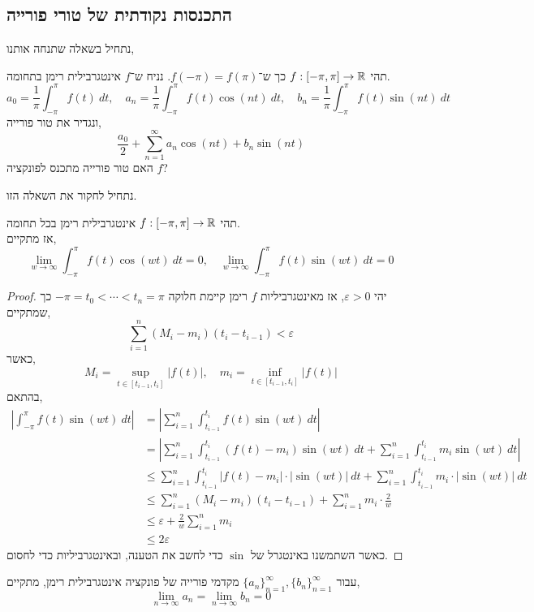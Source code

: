 \subsection{התכנסות נקודתית של טורי פורייה}
נתחיל בשאלה שתנחה אותנו,
\begin{exercise}
	תהי $f : [-\pi, \pi] \to \mathbb{R}$ כך ש־$f(-\pi) = f(\pi)$.
	נניח ש־$f$ אינטגרבילית רימן בתחומה.
	\[
		a_0 = \frac{1}{\pi} \int_{-\pi}^{\pi} f(t)\ dt,
		\quad
		a_n = \frac{1}{\pi} \int_{-\pi}^{\pi} f(t) \cos(nt)\ dt,
		\quad
		b_n = \frac{1}{\pi} \int_{-\pi}^{\pi} f(t) \sin(nt)\ dt
	\]
	ונגדיר את טור פורייה,
	\[
		\frac{a_0}{2} + \sum_{n = 1}^\infty a_n \cos(nt) + b_n \sin(nt)
	\]
	האם טור פורייה מתכנס לפונקציה $f$?
\end{exercise}
נתחיל לחקור את השאלה הזו.
\begin{lemma}
	תהי $f : [-\pi, \pi] \to \mathbb{R}$ אינטגרבילית רימן בכל תחומה. \\
	אז מתקיים,
	\[
		\lim_{w \to \infty} \int_{-\pi}^{\pi} f(t) \cos(w t)\ dt = 0,
		\quad
		\lim_{w \to \infty} \int_{-\pi}^{\pi} f(t) \sin(w t)\ dt = 0
	\]
\end{lemma}
\begin{proof}
	יהי $\varepsilon > 0$, אז מאינטגרביליות $f$ רימן קיימת חלוקה $-\pi = t_0 < \cdots < t_n = \pi$ כך שמתקיים,
	\[
		\sum_{i = 1}^n (M_i - m_i) (t_i - t_{i - 1})
		< \varepsilon
	\]
	כאשר,
	\[
		M_i = \sup_{t \in [t_{i - 1}, t_i]} |f(t)|,
		\quad
		m_i = \inf_{t \in [t_{i - 1}, t_i]} |f(t)|
	\]
	בהתאם,
	\begin{align*}
		\left\lvert \int_{-\pi}^{\pi} f(t) \sin(wt)\ dt \right\rvert
		& = \left\lvert \sum_{i = 1}^n \int_{t_{i - 1}}^{t_i} f(t) \sin(wt)\ dt \right\rvert \\
		& = \left\lvert \sum_{i = 1}^n \int_{t_{i - 1}}^{t_i} (f(t) - m_i) \sin(wt)\ dt + \sum_{i = 1}^n \int_{t_{i - 1}}^{t_i} m_i \sin(wt)\ dt \right\rvert \\
		& \le \sum_{i = 1}^n \int_{t_{i - 1}}^{t_i} |f(t) - m_i| \cdot |\sin(wt)|\ dt + \sum_{i = 1}^n \int_{t_{i - 1}}^{t_i} m_i \cdot |\sin(wt)|\ dt  \\
		& \le \sum_{i = 1}^n (M_i - m_i) (t_i - t_{i - 1}) + \sum_{i = 1}^n m_i \cdot \frac{2}{w} \\
		& \le \varepsilon + \frac{2}{w} \sum_{i = 1}^n m_i \\
		& \le 2\varepsilon
	\end{align*}
	כאשר השתמשנו באינטגרל של $\sin$ כדי לחשב את הטענה, ובאינטגרביליות כדי לחסום.
\end{proof}
\begin{conclusion}
	עבור ${\{ a_n \}}_{n = 1}^\infty, {\{ b_n \}}_{n = 1}^\infty$ מקדמי פורייה של פונקציה אינטגרבילית רימן, מתקיים,
	\[
		\lim_{n \to \infty} a_n
		= \lim_{n \to \infty} b_n
		= 0
	\]
\end{conclusion}
